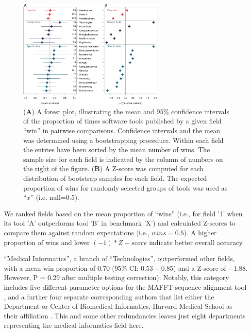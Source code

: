 \documentclass[fleqn,10pt,doc,onecolumn]{SelfArx}%
\begin{document}
\begin{figure}[ht!]
\begin{center}
  \includegraphics[width=0.65\textwidth]{forest-z-Plot.pdf}
\end{center}
\caption{(\textbf{A}) A forest plot, illustrating the mean and 95\%
  confidence intervals of the proportion of times software tools
  published by a given field ``win'' in pairwise
  comparisons. Confidence intervals and the mean was determined using
  a bootstrapping procedure. Within each field the entries have been
  sorted by the mean number of wins. The sample size for each field is
  indicated by the column of numbers on the right of the figure.
  (\textbf{B}) A Z-score was computed for each distribution of
  bootstrap samples for each field. The expected proportion of wins
  for randomly selected groups of tools was used as ``$x$''
  (i.e. null=0.5).}
\label{fig:fig2}
\end{figure}


We ranked fields based on the mean proportion of ``wins'' (i.e., for field '1' when its tool
'A' outperforms tool 'B' in benchmark 'X') and calculated Z-scores
to compare them against random expectations (i.e., $wins = 0.5$). A
higher proportion of wins and lower $(-1) * Z-score$ indicate better
overall accuracy.

``Medical Informatics'', a branch of ``Technologies'', outperformed
other fields, with a mean win proportion of 0.70 (95\% CI:
$0.53-0.85$) and a Z-score of $-1.88$. However, P = 0.29 after
multiple testing correction). Notably, this category includes five
different parameter options for the MAFFT sequence alignment tool
\cite{katoh2008recent}, and a further four separate corresponding
authors that list either the Department or Center of Biomedical
Informatics, Harvard Medical School as their affiliation
\cite{kim2010rsw,yang2013diverse,kharchenko2014bayesian,ruan2020fast}. This
and some other redundancies leaves just eight departments
representing the medical informatics field here.
\end{document}
